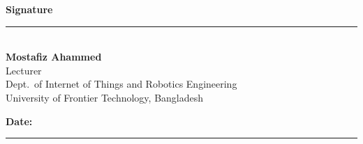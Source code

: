 \vspace{0.65cm}

\noindent
\begin{minipage}[t]{0.46\textwidth}
\textbf{Signature}\\[-0.1cm]
\rule{\linewidth}{0.4pt}\\[0.15cm]
\textbf{Mostafiz Ahammed}\\
Lecturer\\
Dept.\ of Internet of Things and Robotics Engineering\\
University of Frontier Technology, Bangladesh
\end{minipage}

\vfill

\noindent
\textbf{Date:} \rule{4.5cm}{0.4pt}